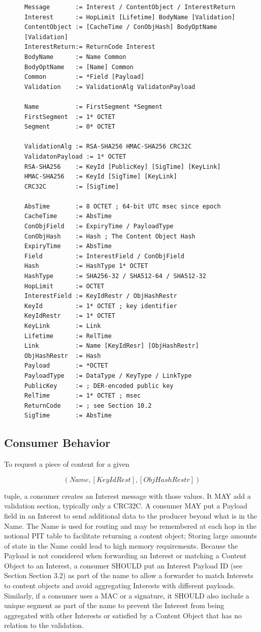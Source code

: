 \documentclass[12pt]{article}
\begin{document}
\begin{figure}
\begin{verbatim}
Message       := Interest / ContentObject / InterestReturn
Interest      := HopLimit [Lifetime] BodyName [Validation]
ContentObject := [CacheTime / ConObjHash] BodyOptName [Validation]
InterestReturn:= ReturnCode Interest
BodyName      := Name Common
BodyOptName   := [Name] Common
Common        := *Field [Payload]
Validation    := ValidationAlg ValidatonPayload

Name          := FirstSegment *Segment
FirstSegment  := 1* OCTET
Segment       := 0* OCTET

ValidationAlg := RSA-SHA256 HMAC-SHA256 CRC32C
ValidatonPayload := 1* OCTET
RSA-SHA256    := KeyId [PublicKey] [SigTime] [KeyLink]
HMAC-SHA256   := KeyId [SigTime] [KeyLink]
CRC32C        := [SigTime]

AbsTime       := 8 OCTET ; 64-bit UTC msec since epoch
CacheTime     := AbsTime
ConObjField   := ExpiryTime / PayloadType
ConObjHash    := Hash ; The Content Object Hash
ExpiryTime    := AbsTime
Field         := InterestField / ConObjField
Hash          := HashType 1* OCTET
HashType      := SHA256-32 / SHA512-64 / SHA512-32
HopLimit      := OCTET
InterestField := KeyIdRestr / ObjHashRestr
KeyId         := 1* OCTET ; key identifier
KeyIdRestr    := 1* OCTET
KeyLink       := Link
Lifetime      := RelTime
Link          := Name [KeyIdResr] [ObjHashRestr]
ObjHashRestr  := Hash
Payload       := *OCTET
PayloadType   := DataType / KeyType / LinkType
PublicKey     := ; DER-encoded public key
RelTime       := 1* OCTET ; msec
ReturnCode    := ; see Section 10.2
SigTime       := AbsTime
\end{verbatim}
\end{figure}

\subsection{Consumer Behavior}
To request a piece of content for a given

$$
(Name, [KeyIdRest], [ObjHashRestr])
$$

tuple, a consumer creates an Interest message with
those values.  It MAY add a validation section, typically only a
CRC32C.  A consumer MAY put a Payload field in an Interest to send
additional data to the producer beyond what is in the Name.  The Name
is used for routing and may be remembered at each hop in the notional
PIT table to facilitate returning a content object; Storing large
amounts of state in the Name could lead to high memory requirements.
Because the Payload is not considered when forwarding an Interest or
matching a Content Object to an Interest, a consumer SHOULD put an
Interest Payload ID (see Section Section 3.2) as part of the name to
allow a forwarder to match Interests to content objects and avoid
aggregating Interests with different payloads.  Similarly, if a
consumer uses a MAC or a signature, it SHOULD also include a unique
segment as part of the name to prevent the Interest from being
aggregated with other Interests or satisfied by a Content Object that
has no relation to the validation.
\end{document}
